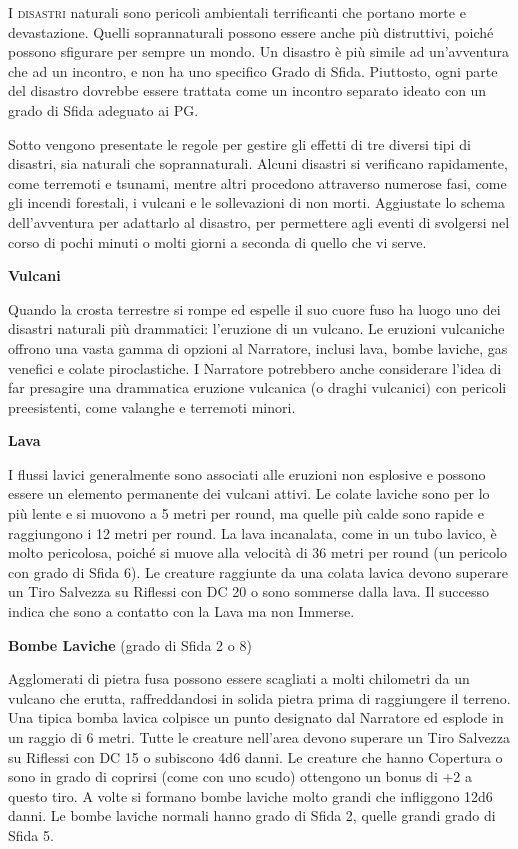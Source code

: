 \documentclass[a4paper,twoside,openany]{book}
\begin{document}
\begin{multicols}{2}


\lettrine[lines=2, lhang=0.33, loversize=0.25, findent=1.5em]{I}{ disastri} naturali sono pericoli ambientali terrificanti che portano morte e devastazione. Quelli soprannaturali possono essere anche più distruttivi, poiché possono sfigurare per sempre un mondo. Un disastro è più simile ad un'avventura che ad un incontro, e non ha uno specifico Grado di Sfida. Piuttosto, ogni parte del disastro dovrebbe essere trattata come un incontro separato ideato con un grado di Sfida adeguato ai PG.

Sotto vengono presentate le regole per gestire gli effetti di tre diversi tipi di disastri, sia naturali che soprannaturali. Alcuni disastri si verificano rapidamente, come terremoti e tsunami, mentre altri procedono attraverso numerose fasi, come gli incendi forestali, i vulcani e le sollevazioni di non morti. Aggiustate lo schema dell'avventura per adattarlo al disastro, per permettere agli eventi di svolgersi nel corso di pochi minuti o molti giorni a seconda di quello che vi serve.

\textbf{Vulcani}

Quando la crosta terrestre si rompe ed espelle il suo cuore fuso ha luogo uno dei disastri naturali più drammatici: l'eruzione di un vulcano. Le eruzioni vulcaniche offrono una vasta gamma di opzioni al Narratore, inclusi lava, bombe laviche, gas venefici e colate piroclastiche. I Narratore potrebbero anche considerare l'idea di far presagire una drammatica eruzione vulcanica (o draghi vulcanici) con pericoli preesistenti, come valanghe e terremoti minori.

\textbf{Lava}

I flussi lavici generalmente sono associati alle eruzioni non esplosive e possono essere un elemento permanente dei vulcani attivi. Le colate laviche sono per lo più lente e si muovono a 5 metri per round, ma quelle più calde sono rapide e raggiungono i 12 metri per round. La lava incanalata, come in un tubo lavico, è molto pericolosa, poiché si muove alla velocità di 36 metri per round (un pericolo con grado di Sfida 6). Le creature raggiunte da una colata lavica devono superare un Tiro Salvezza su Riflessi con DC 20 o sono sommerse dalla lava. Il successo indica che sono a contatto con la Lava ma non Immerse.

\textbf{Bombe Laviche} (grado di Sfida 2 o 8)

Agglomerati di pietra fusa possono essere scagliati a molti chilometri da un vulcano che erutta, raffreddandosi in solida pietra prima di raggiungere il terreno. Una tipica bomba lavica colpisce un punto designato dal Narratore ed esplode in un raggio di 6 metri. Tutte le creature nell'area devono superare un Tiro Salvezza su Riflessi con DC 15 o subiscono 4d6 danni. Le creature che hanno Copertura o sono in grado di coprirsi (come con uno scudo) ottengono un bonus di +2 a questo tiro. A volte si formano bombe laviche molto grandi che infliggono 12d6 danni. Le bombe laviche normali hanno grado di Sfida 2, quelle grandi grado di Sfida 5.


\end{multicols}
\end{document}
